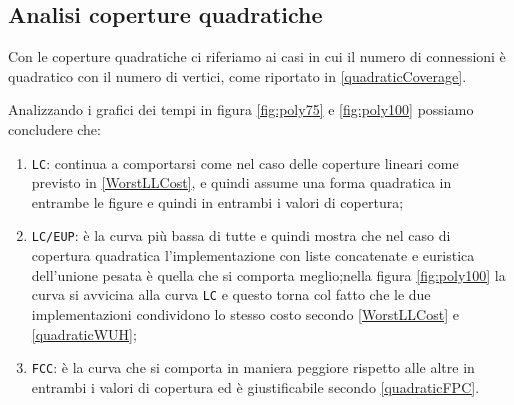 \subsection{Analisi coperture quadratiche}
Con le coperture quadratiche ci riferiamo ai casi in cui il numero di connessioni è quadratico con il numero di vertici, come riportato in \eqref{quadraticCoverage}.

Analizzando i grafici dei tempi in figura \ref{fig:poly75} e \ref{fig:poly100} possiamo concludere che:
\begin{enumerate}
    \item \texttt{LC}: continua a comportarsi come nel caso delle coperture lineari come previsto in \eqref{WorstLLCost}, e quindi assume una forma quadratica
          in entrambe le figure e quindi in entrambi i valori di copertura;
    \item \texttt{LC/EUP}: è la curva più bassa di tutte e quindi mostra che nel caso di copertura quadratica l'implementazione con liste concatenate e euristica dell'unione
          pesata è quella che si comporta meglio;nella figura \ref{fig:poly100} la curva si avvicina alla curva \texttt{LC} e questo
          torna col fatto che le due implementazioni condividono lo stesso costo secondo \eqref{WorstLLCost} e \eqref{quadraticWUH};
    \item \texttt{FCC}: è la curva che si comporta in maniera peggiore rispetto alle altre in entrambi i valori di copertura ed è giustificabile secondo
          \eqref{quadraticFPC}.
\end{enumerate}


